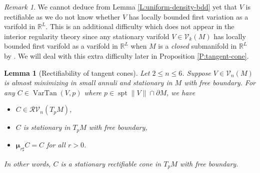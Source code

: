 \documentclass[10pt]{amsart}
\newtheorem{lemma}[theorem]{Lemma}
\theoremstyle{definition}
\theoremstyle{remark}
\newtheorem{remark}[theorem]{Remark}
\numberwithin{equation}{section}
\newcommand{\V}{\mathcal{V}}
\newcommand{\RV}{\mathcal{RV}}
\newcommand{\R}{\mathbb{R}}
\newcommand{\bmu}{\boldsymbol \mu}
\newcommand{\VarTan}{\operatorname{VarTan}}
\newcommand{\spt}{\operatorname{spt}}
\begin{document}
\begin{remark}
We cannot deduce from Lemma \ref{L:uniform-density-bdd} yet that $V$ is rectifiable as we do not know whether $V$ has locally bounded first variation as a varifold in $\mathbb{R}^L$. This is an additional difficulty which does not appear in the interior regularity theory since any stationary varifold $V \in \V_k(M)$ has locally bounded first varifold as a varifold in $\R^L$ when $M$ is a \emph{closed} submanifold in $\R^L$ by \cite[Remark 4.4]{Allard72}. We will deal with this extra difficulty later in Proposition \ref{P:tangent-cone}.
\end{remark}


\begin{lemma}[Rectifiability of tangent cones]
\label{L:tangent-cone}
Let $2 \leq n \leq 6$. Suppose $V \in \V_n(M)$ is almost minimizing in small annuli and stationary in $M$ with free boundary. For any $C \in \VarTan(V,p)$ where $p \in \spt \|V\| \cap \partial M$, we have
\begin{itemize}
\item[(a)] $C \in \RV_n(T_pM)$,
\item[(b)] $C$ is stationary in $T_pM$ with free boundary,
\item[(c)] $\bmu_{r \sharp} C=C$ for all $r>0$.
\end{itemize}
In other words, $C$ is a stationary rectifiable cone in $T_pM$ with free boundary.
\end{lemma}
\end{document}
